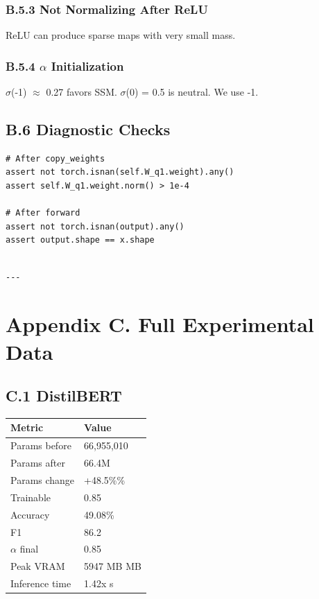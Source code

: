 \subsubsection{B.5.3 Not Normalizing After ReLU}

ReLU can produce sparse maps with very small mass.

\subsubsection{B.5.4 $\alpha$ Initialization}

$\sigma$(-1) $\approx$ 0.27 favors SSM. $\sigma$(0) = 0.5 is neutral. We use -1.

\subsection{B.6 Diagnostic Checks}

\begin{lstlisting}
# After copy_weights
assert not torch.isnan(self.W_q1.weight).any()
assert self.W_q1.weight.norm() > 1e-4

# After forward
assert not torch.isnan(output).any()
assert output.shape == x.shape
\end{lstlisting}
\begin{lstlisting}

---
\end{lstlisting}

\section{Appendix C. Full Experimental Data}

\subsection{C.1 DistilBERT}

\begin{table}[H]
\centering
\small
\begin{tabular}{ll}
\toprule
\textbf{Metric} & \textbf{Value} \\
\midrule
Params before & 66,955,010 \\
Params after & 66.4M \\
Params change & +48.5\%\% \\
Trainable & 0.85 \\
Accuracy & 49.08\% \\
F1 & 86.2 \\
$\alpha$ final & 0.85 \\
Peak VRAM & 5947 MB MB \\
Inference time & 1.42x s \\
\bottomrule
\end{tabular}
\end{table}

